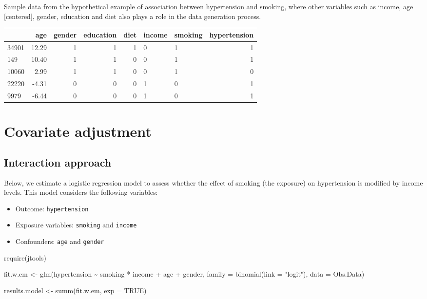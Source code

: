 \documentclass[
  letterpaper,
  DIV=11,
  numbers=noendperiod]{scrreprt}
\newenvironment{Shaded}{\begin{snugshade}}{\end{snugshade}}
\newcommand{\AttributeTok}[1]{\textcolor[rgb]{0.40,0.45,0.13}{#1}}
\newcommand{\ConstantTok}[1]{\textcolor[rgb]{0.56,0.35,0.01}{#1}}
\newcommand{\FunctionTok}[1]{\textcolor[rgb]{0.28,0.35,0.67}{#1}}
\newcommand{\NormalTok}[1]{\textcolor[rgb]{0.00,0.23,0.31}{#1}}
\newcommand{\OtherTok}[1]{\textcolor[rgb]{0.00,0.23,0.31}{#1}}
\newcommand{\SpecialCharTok}[1]{\textcolor[rgb]{0.37,0.37,0.37}{#1}}
\newcommand{\StringTok}[1]{\textcolor[rgb]{0.13,0.47,0.30}{#1}}
\providecommand{\tightlist}{%
  \setlength{\itemsep}{0pt}\setlength{\parskip}{0pt}}\usepackage{longtable,booktabs,array}
\begin{document}
Sample data from the hypothetical example of association between
hypertension and smoking, where other variables such as income, age
{[}centered{]}, gender, education and diet also plays a role in the data
generation process.

\begin{table}[!h]
\centering
\begin{tabular}{lrrrrllr}
\toprule
  & age & gender & education & diet & income & smoking & hypertension\\
\midrule
34901 & 12.29 & 1 & 1 & 1 & 0 & 1 & 1\\
149 & 10.40 & 1 & 1 & 0 & 0 & 1 & 1\\
10060 & 2.99 & 1 & 1 & 0 & 0 & 1 & 0\\
22220 & -4.31 & 0 & 0 & 0 & 1 & 0 & 1\\
9979 & -6.44 & 0 & 0 & 0 & 1 & 0 & 1\\
\bottomrule
\end{tabular}
\end{table}

\hypertarget{covariate-adjustment}{%
\section{Covariate adjustment}\label{covariate-adjustment}}

\hypertarget{interaction-approach}{%
\subsection{Interaction approach}\label{interaction-approach}}

Below, we estimate a logistic regression model to assess whether the
effect of smoking (the exposure) on hypertension is modified by income
levels. This model considers the following variables:

\begin{itemize}
\tightlist
\item
  Outcome: \texttt{hypertension}
\item
  Exposure variables: \texttt{smoking} and \texttt{income}
\item
  Confounders: \texttt{age} and \texttt{gender}
\end{itemize}

\begin{Shaded}
\begin{Highlighting}[]
\FunctionTok{require}\NormalTok{(jtools)}

\NormalTok{fit.w.em }\OtherTok{\textless{}{-}} \FunctionTok{glm}\NormalTok{(hypertension }\SpecialCharTok{\textasciitilde{}}\NormalTok{ smoking }\SpecialCharTok{*}\NormalTok{ income }\SpecialCharTok{+}\NormalTok{ age }\SpecialCharTok{+}\NormalTok{ gender, }
            \AttributeTok{family =} \FunctionTok{binomial}\NormalTok{(}\AttributeTok{link =} \StringTok{"logit"}\NormalTok{), }\AttributeTok{data =}\NormalTok{ Obs.Data)}

\NormalTok{results.model }\OtherTok{\textless{}{-}} \FunctionTok{summ}\NormalTok{(fit.w.em, }\AttributeTok{exp =} \ConstantTok{TRUE}\NormalTok{)}
\end{Highlighting}
\end{Shaded}
\end{document}
